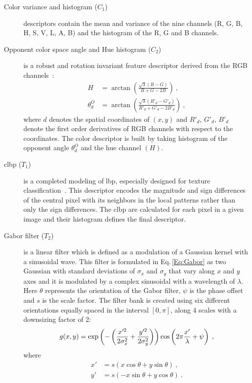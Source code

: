 \begin{description}
\item[Color variance and histogram ($C_{1}$)] descriptors contain the mean and variance of the nine channels (R, G, B, H, S, V, L, A, B) and the histogram of the R, G and B channels.
\item[Opponent color space angle and Hue histogram ($C_{2}$)] is a robust and rotation invariant feature descriptor derived from the RGB channels~\cite{van2006coloring}:
  \begin{align}\label{Eq:AngO}
    H &= \arctan\left(\frac{\sqrt{3}\left(R-G\right)}{R+G-2B}\right) \ , \nonumber \\
    \theta^{O}_{d} &= \arctan \left( \frac{\sqrt{3}\left(R'_{d}-G'_{d}\right)}{R'_{d}+G'_{d}-2B'_{d}}\right) \ ,
  \end{align}
\noindent where $d$ denotes the spatial coordinates of $(x,y)$ and $R'_{d}$, $G'_{d}$, $B'_{d}$ denote the first order derivatives of RGB channels with respect to the coordinates. 
The color descriptor is built by taking histogram of the opponent angle $\theta^{O}_{d}$ and the hue channel $(H)$.
\item[\ac{clbp} ($T_{1}$)] is a completed modeling of \Ac{lbp}, especially designed for texture classification~\cite{guo2010completed}. 
This descriptor encodes the magnitude and sign differences of the central pixel with its neighbors in the local patterns rather than only the sign differences. 
The \ac{clbp} are calculated for each pixel in a given image and their histogram defines the final descriptor.
\item[Gabor filter ($T_{2}$)] is a linear filter which is defined as a modulation of a Gaussian kernel with a sinusoidal wave. 
This filter is formulated in Eq.\,\eqref{Eq:Gabor} as two Gaussian with standard deviations of $\sigma_{x}$ and $\sigma_{y}$ that vary along $x$ and $y$ axes and it is modulated by a complex sinusoidal with a wavelength of $\lambda$. 
Here $\theta$ represents the orientation of the Gabor filter, $\psi$ is the phase offset and $s$ is the scale factor. 
The filter bank is created using six different orientations equally spaced in the interval $[0, \pi]$, along 4 scales with a downsizing factor of 2:
\begin{equation}\scriptsize
  \label{Eq:Gabor}
  g(x,y) = \exp{ \left(-\left( \frac{x'^{2}}{2\sigma_{x}^{2}}+\frac{y'^{2}}{2\sigma_{y}^{2}} \right) \right)} \cos\left( 2\pi\frac{x'}{\lambda}+\psi \right) \ , 
\end{equation}
\noindent where
\begin{align*}
  x' &= s\left( x\cos\theta+y\sin\theta\right) \ ,  \\
  y' &= s\left( -x\sin\theta +y\cos\theta\right) \ .
\end{align*}

\end{description}

